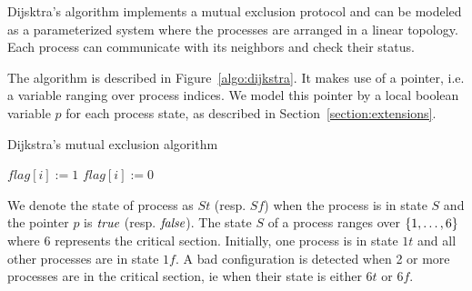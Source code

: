 \label{app:dijkstra}
Dijsktra's algorithm %
 implements a mutual
exclusion protocol and can be modeled as a parameterized system where
the processes are arranged in a linear topology. Each process can
communicate with its neighbors and check their status.

%
The algorithm is described in Figure~\ref{algo:dijkstra}.
%
It makes use of a pointer, i.e. a variable ranging over
process indices. We model this pointer by a local boolean variable $p$
for each process state, as described in Section~\ref{section:extensions}.

\newcommand{\flagof}[1]{\mathit{flag}[#1]}
\LinesNotNumbered
\begin{algorithm}
\caption{Dijkstra's mutual exclusion algorithm}
\label{algo:dijkstra}
  \DontPrintSemicolon
  \SetAlgoNoLine
$\flagof i:=1$\;
\If{$p\neq i$}{
\MyAwait{$\flagof p = 0$}{$p:=i$}
}
\lIf{$\exists j\neq i:\flagof j$}{\Goto 1}\;
$\flagof i := 0$\;
\end{algorithm}

We denote the state of process as $St$ (resp. $Sf$) when the process
is in state $S$ and the pointer $p$ is $\emph{true}$ (resp. $\emph{false}$). The
state $S$ of a process ranges over $\left\{1,\ldots,6\right\}$ where $6$
represents the critical section.
%
Initially, one process is in state $1t$ and all other processes are in
state $1f$. A bad configuration is detected when 2 or more processes
are in the critical section, ie when their state is either $6t$ or
$6f$.

